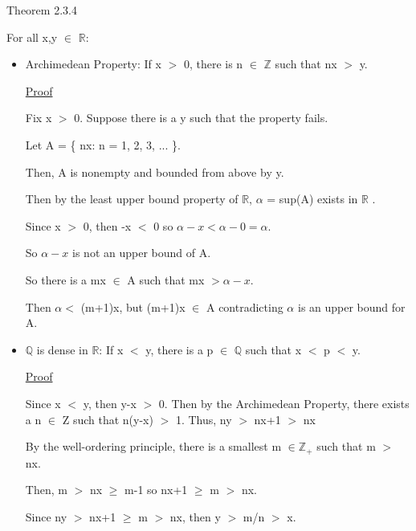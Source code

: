 {\color{red} Theorem 2.3.4}

	\hspace{0.9cm} For all x,y $\in$ $ \mathbb{R} $:

	\begin{itemize}[leftmargin=1cm, itemsep=0.1cm]
		\item {\color{lblue} Archimedean Property}:
			If x $>$ 0, there is n $\in$ $ \mathbb{Z} $ such that nx $>$ y.
	
			{ \color{magenta} \underline{Proof} }

				Fix x $>$ 0. Suppose there is a y such that the property fails.

				Let A = \{ nx: n = 1, 2, 3, ... \}.

				Then, A is nonempty and bounded from above by y.

				Then by the least upper bound property of $ \mathbb{R} $,
				$\alpha$ = sup(A) exists in $ \mathbb{R} $ .

				Since x $>$ 0, then -x $<$ 0 so $\alpha - x < \alpha-0 = \alpha$.

				So $\alpha-x$ is not an upper bound of A.

				So there is a mx $\in$ A such that mx $> \alpha-x$.

				Then $\alpha <$ (m+1)x, but (m+1)x $\in$ A
				contradicting $\alpha$ is an upper bound for A.

		\item {\color{lblue} $ \mathbb{Q} $  is dense in $ \mathbb{R} $}:
			If x $<$ y, there is a p $\in$ $ \mathbb{Q} $ such that x $<$ p $<$ y.

			{ \color{magenta} \underline{Proof} }

				Since x $<$ y, then y-x $>$ 0. Then by the Archimedean Property,
				there exists a n $\in$ Z such that n(y-x) $>$ 1. Thus, ny $>$ nx+1 $>$ nx

				By the well-ordering principle, there is a smallest m $\in \mathbb{Z_+} $
				such that m $>$ nx.

				Then, m $>$ nx $\geq$ m-1 so nx+1 $\geq$ m $>$ nx.

				Since ny $>$ nx+1 $\geq$ m $>$ nx, then y $>$ m/n $>$ x.
\end{itemize}
